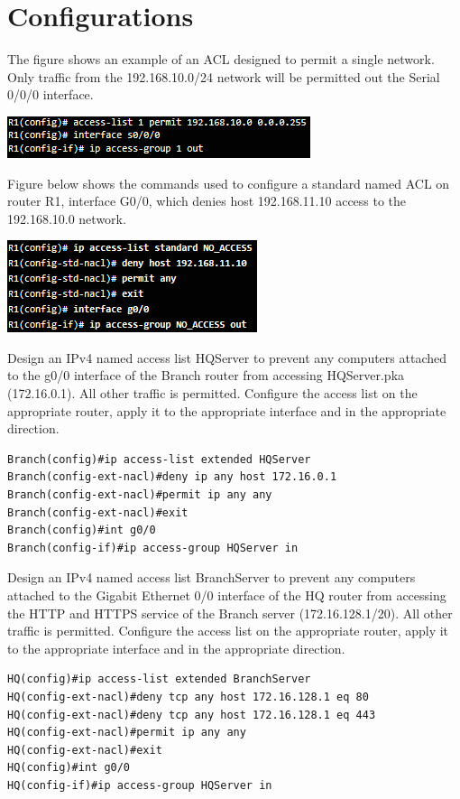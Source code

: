 \section{Configurations}
\begin{example}
The figure shows an example of an ACL designed to permit a single network. Only traffic from the 192.168.10.0/24 network will be permitted out the Serial 0/0/0 interface.\\
\begin{listing}
\includegraphics[scale=1]{pictures/example0.PNG} 
\end{listing}
\end{example}
\begin{example}
Figure below shows the commands used to configure a standard named ACL on router R1, interface G0/0, which denies host 192.168.11.10 access to the 192.168.10.0 network.\\
\begin{listing}
\includegraphics[scale=1]{pictures/example1.PNG} 
\end{listing}
\end{example}
\begin{example}
Design an IPv4 named access list HQServer to prevent any computers attached to the g0/0 interface of the Branch router from accessing HQServer.pka (172.16.0.1). All other traffic is permitted. Configure the access list on the appropriate router, apply it to the appropriate interface and in the appropriate direction.
	\begin{verbatim}
Branch(config)#ip access-list extended HQServer
Branch(config-ext-nacl)#deny ip any host 172.16.0.1
Branch(config-ext-nacl)#permit ip any any
Branch(config-ext-nacl)#exit
Branch(config)#int g0/0
Branch(config-if)#ip access-group HQServer in
	\end{verbatim}
\end{example}
\begin{example}
Design an IPv4 named access list BranchServer to prevent any computers attached to the Gigabit Ethernet 0/0 interface of the HQ router from accessing the HTTP and HTTPS service of the Branch server (172.16.128.1/20). All other traffic is permitted. Configure the access list on the appropriate router, apply it to the appropriate interface and in the appropriate direction.
\begin{verbatim}
HQ(config)#ip access-list extended BranchServer
HQ(config-ext-nacl)#deny tcp any host 172.16.128.1 eq 80
HQ(config-ext-nacl)#deny tcp any host 172.16.128.1 eq 443
HQ(config-ext-nacl)#permit ip any any
HQ(config-ext-nacl)#exit
HQ(config)#int g0/0
HQ(config-if)#ip access-group HQServer in
\end{verbatim}
\end{example}
